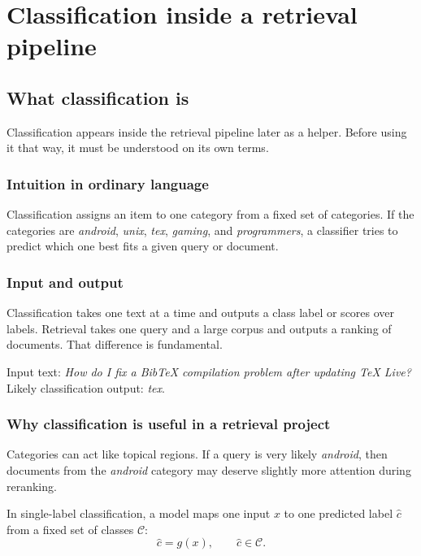 \documentclass[11pt,oneside]{report}
\begin{document}
\part[Classification Support]{Classification inside a retrieval pipeline}
\chapter[What Classification Is]{What classification is}

\begin{purposebox}
Classification appears inside the retrieval pipeline later as a helper. Before using it that way, it must be understood on its own terms.
\end{purposebox}

\section*{Intuition in ordinary language}
Classification assigns an item to one category from a fixed set of categories. If the categories are \emph{android}, \emph{unix}, \emph{tex}, \emph{gaming}, and \emph{programmers}, a classifier tries to predict which one best fits a given query or document.

\section*{Input and output}
Classification takes one text at a time and outputs a class label or scores over labels. Retrieval takes one query and a large corpus and outputs a ranking of documents. That difference is fundamental.

\begin{examplebox}
Input text: \emph{How do I fix a BibTeX compilation problem after updating TeX Live?}\\
Likely classification output: \emph{tex}.
\end{examplebox}

\section*{Why classification is useful in a retrieval project}
Categories can act like topical regions. If a query is very likely \emph{android}, then documents from the \emph{android} category may deserve slightly more attention during reranking.

\begin{formulabox}
In single-label classification, a model maps one input $x$ to one predicted label $\hat{c}$ from a fixed set of classes $\mathcal{C}$:
\[
\hat{c}=g(x), \qquad \hat{c}\in\mathcal{C}.
\]
\end{formulabox}
\end{document}
